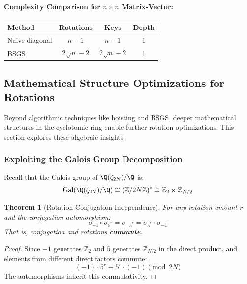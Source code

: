 \documentclass[11pt,a4paper]{article}
\newtheorem{theorem}{Theorem}
\newcommand{\Z}{\mathbb{Z}}
\begin{document}
\paragraph{Complexity Comparison for $n \times n$ Matrix-Vector:}
\begin{center}
\begin{tabular}{lccc}
\toprule
\textbf{Method} & \textbf{Rotations} & \textbf{Keys} & \textbf{Depth} \\
\midrule
Naive diagonal & $n - 1$ & $n - 1$ & 1 \\
BSGS & $2\sqrt{n} - 2$ & $2\sqrt{n} - 2$ & 1 \\
\bottomrule
\end{tabular}
\end{center}

\subsection{Mathematical Structure Optimizations for Rotations}

Beyond algorithmic techniques like hoisting and BSGS, deeper mathematical structures in the cyclotomic ring enable further rotation optimizations. This section explores these algebraic insights.

\subsubsection{Exploiting the Galois Group Decomposition}

Recall that the Galois group of $\Q(\zeta_{2N})/\Q$ is:
\[
\text{Gal}(\Q(\zeta_{2N})/\Q) \cong (\Z/2N\Z)^* \cong \Z_2 \times \Z_{N/2}
\]

\begin{theorem}[Rotation-Conjugation Independence]
For any rotation amount $r$ and the conjugation automorphism:
\[
\sigma_{-1} \circ \sigma_{5^r} = \sigma_{-5^r} = \sigma_{5^r} \circ \sigma_{-1}
\]
That is, conjugation and rotations \textbf{commute}.
\end{theorem}

\begin{proof}
Since $-1$ generates $\Z_2$ and $5$ generates $\Z_{N/2}$ in the direct product, and elements from different direct factors commute:
\[
(-1) \cdot 5^r \equiv 5^r \cdot (-1) \pmod{2N}
\]
The automorphisms inherit this commutativity.
\end{proof}
\end{document}
